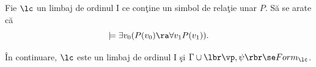 \documentclass[12pt]{article}
\begin{document}
\renewcommand{\seminarno}{5}
\setcounter{exercitiuno}{0}

\titluseminarLM


\renewcommand{\solution}[1]{}

\parindent0pt

\semex
Fie $\lc$ un limbaj de ordinul I ce con\c tine un simbol de rela\c tie unar $P$. S\u a se arate c\u a 
$$ \models \exists v_0 (P(v_0) \ra \forall v_1 P(v_1)).$$
\solution{
Fie $\cA$ o $\lc$-structur\u a \c si $e: V \to A$ o evaluare. 
Atunci:  

$\cA \models \big(\exists v_0 (P(v_0) \ra \forall v_1 P(v_1)) \big)[e]$   \ddacam   exist\u a $a \in A$ \ai  $\cA \models (P(v_0) \ra \forall v_1 P(v_1))[e_{v_0 \mapsto a}]$ \\
 \ddacam  exist\u a $a \in A$ \ai \big( $\cA \not\models (P(v_0))[e_{v_0  \mapsto  a}]$ sau $\cA \models (\forall v_1 P(v_1))[e_{v_0  \mapsto a}$] \big) \\
 \ddacam    exist\u a $a \in A$ \ai  \big($a \not\in P^\cA$ sau pentru orice $b \in A$, $b \in P^\cA$\big) \\
  \ddacam    \big(exist\u a $a \in A$ \ai  $a \not\in P^\cA$\big) sau \big(pentru orice $b \in A$, $b \in P^\cA$\big)\\
    \ddacam   $P^\cA\ne A$ sau $P^\cA =A$,
  
  ceea ce este adev\u arat.
}

\mbox{}

\^In continuare,  $\lc$  este un limbaj de ordinul I \c si  $\Gamma\cup\lbr \vp, \psi \rbr \se Form_\lc$.
\end{document}
